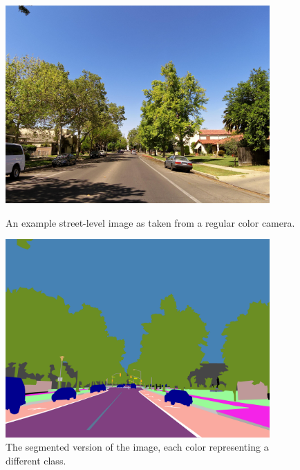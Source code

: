 \begin{figure}
    \centering
    \begin{minipage}{0.45\textwidth}
        \centering
        \includegraphics[width=0.9\textwidth]{figures/background/raw.jpg} %
        \caption{An example street-level image as taken from a regular color camera.} \label{fig:background-raw}
    \end{minipage}\hfill
    \begin{minipage}{0.45\textwidth}
        \centering
        \includegraphics[width=0.9\textwidth]{figures/background/segmented.png} %
        \caption{The segmented version of the image, each color representing a different class.} \label{fig:background-segmented}
    \end{minipage}
\end{figure}
